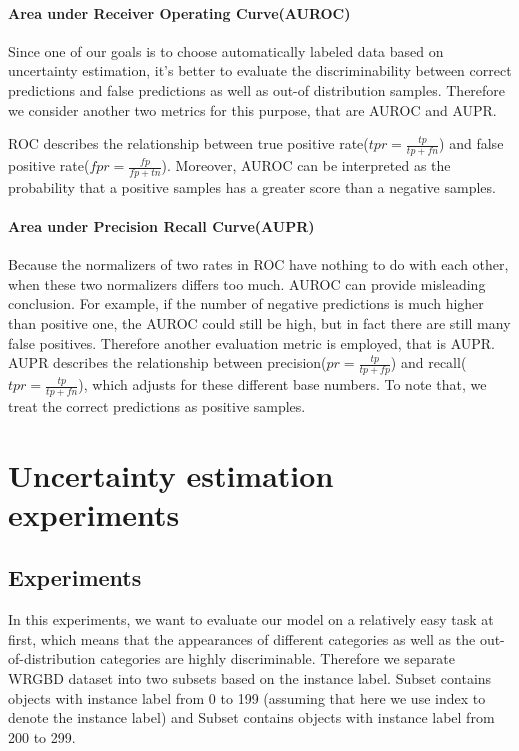 \paragraph{Area under Receiver Operating Curve(AUROC)} Since one of our goals is to choose automatically labeled data based on uncertainty estimation, it's better to evaluate the discriminability between correct predictions and false predictions as well as out-of distribution samples. Therefore we consider another two metrics for this purpose, that are AUROC and AUPR.

ROC describes the relationship between true positive rate($tpr=\frac{tp}{tp+fn}$) and false positive rate($fpr=\frac{fp}{fp+tn}$). Moreover, AUROC can be interpreted as the probability that a positive samples has a greater score than a negative samples.

\paragraph{Area under Precision Recall Curve(AUPR)} Because the normalizers of two rates in ROC have nothing to do with each other, when these two normalizers differs too much. AUROC can provide misleading conclusion. For example, if the number of negative predictions is much higher than positive one, the AUROC could still be high, but in fact there are still many false positives. Therefore another evaluation metric is employed, that is AUPR. AUPR describes the relationship between precision($pr = \frac{tp}{tp+fp}$) and recall($tpr=\frac{tp}{tp+fn}$), which adjusts for these different base numbers. To note that, we treat the correct predictions as positive samples.

\section{Uncertainty estimation experiments}
\subsection{Experiments }
In this experiments, we want to evaluate our model on a relatively easy task at first, which means that the appearances of different categories as well as the out-of-distribution categories are highly discriminable. Therefore we separate WRGBD dataset into two subsets based on the instance label. Subset  contains objects with instance label from 0 to 199 (assuming that here we use index to denote the instance label) and Subset  contains objects with instance label from 200 to 299. 


